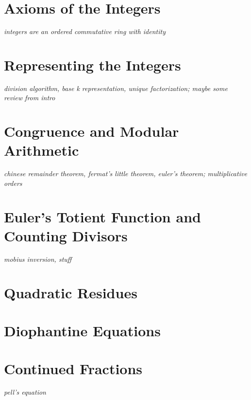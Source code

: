 \documentclass[../../../main.tex]{subfiles}
\begin{document}

\section{Axioms of the Integers}
\textit{integers are an ordered commutative ring with identity}

\section{Representing the Integers}
\textit{division algorithm, base k representation, unique factorization; maybe some review from intro}

\section{Congruence and Modular Arithmetic}
\textit{chinese remainder theorem, fermat's little theorem, euler's theorem; multiplicative orders}

\section{Euler's Totient Function and Counting Divisors}
\textit{mobius inversion, stuff}

\section{Quadratic Residues}

\section{Diophantine Equations}

\section{Continued Fractions}
\textit{pell's equation}

\printbibliography[
    heading=subbibintoc,
    title={References}
]
\end{document}
